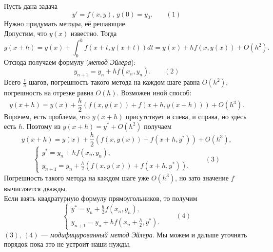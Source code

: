 
Пусть дана задача 
$$y'=f(x,y), \, y(0)=y_0. \qquad (1)$$
Нужно придумать методы, её решающие.\\
Допустим, что $y(x)$ известно. Тогда
$$y(x+h) = y(x) + \int_0^h f(x+t, y(x+t))dt = y(x) + hf(x, y(x)) + O(h^2).$$
Отсюда получаем формулу (\emph{метод Эйлера}):
$$y_{n+1} = y_n + hf(x_n, y_n). \qquad (2)$$
Всего $\frac{1}{h}$ шагов, погрешность такого метода на каждом шаге равна $O(h^2)$, погрешность на отрезке равна $O(h)$.
Возможен иной способ:
$$y(x+h) = y(x) + \frac{h}{2}\left( f(x, y(x)) + f(x+h, y(x+h)) \right) + O(h^3).$$
Впрочем, есть проблема, что $y(x+h)$ присутствует и слева, и справа, но здесь есть $h$. Поэтому из $y(x+h)=y^\ast+O(h^2)$ получаем
$$y(x+h) = y(x) + \frac{h}{2}\left( f(x, y(x)) + f(x+h, y^\ast) \right) + O(h^3),$$
$$\begin{cases}
	y^\ast = y_n + hf(x_n, y_n), \\
	y_{n+1} = y_n + \frac{h}{2}\left( f(x, y(x)) + f(x+h, y^\ast) \right).
\end{cases} \qquad (3)$$
Погрешность такого метода на каждом шаге уже $O(h^3)$, но зато значение $f$ вычисляется дважды.\\
Если взять квадратурную формулу прямоугольников, то получим
$$\begin{cases}
	y^\ast = y_n + \frac{h}{2}f(x_n, y_n), \\
	y_{n+1} = y_n + hf\left( x_n+\frac{h}{2}, y^\ast \right).
\end{cases} \qquad (4)$$
$(3), \, (4)$ --- \emph{модифицированный метод Эйлера}. Мы можем и дальше уточнять порядок пока это не устроит наши нужды.

